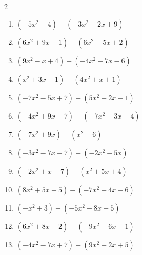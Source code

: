\begin{multicols}{2}
\begin{enumerate}
  \item $(-5x^{2}-4)-(-3x^{2}-2x+9)$


  \item $(6x^{2}+9x-1)-(6x^{2}-5x+2)$

        \phantom{$=14x-3$}

  \item $(9x^{2}-x+4)-(-4x^{2}-7x-6)$


  \item $(x^{2}+3x-1)-(4x^{2}+x+1)$


  \item $(-7x^{2}-5x+7)+(5x^{2}-2x-1)$


  \item $(-4x^{2}+9x-7)-(-7x^{2}-3x-4)$


  \item $(-7x^{2}+9x)+(x^{2}+6)$


  \item $(-3x^{2}-7x-7)+(-2x^{2}-5x)$


\columnbreak %

\resetques

  \item $(-2x^{2}+x+7)-(x^{2}+5x+4)$


  \item $(8x^{2}+5x+5)-(-7x^{2}+4x-6)$


  \item $(-x^{2}+3)-(-5x^{2}-8x-5)$


  \item $(6x^{2}+8x-2)-(-9x^{2}+6x-1)$


  \item $(-4x^{2}-7x+7)+(9x^{2}+2x+5)$



\end{enumerate}
\end{multicols}
